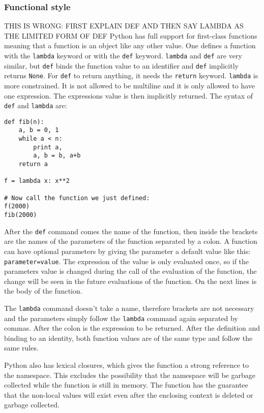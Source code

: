 \subsubsection{Functional style}

THIS IS WRONG: FIRST EXPLAIN DEF AND THEN SAY LAMBDA AS THE LIMITED FORM OF DEF
Python has full support for first-class functions meaning that a function is an
object like any other value. One defines a function with the \texttt{lambda}
keyword or with the \texttt{def} keyword. \texttt{lambda} and \texttt{def} are
very similar, but \texttt{def} binds the function value to an identifier and
\texttt{def} implicitly returns \texttt{None}. For \texttt{def} to return
anything, it needs the \texttt{return} keyword. \texttt{lambda} is more
constrained. It is not allowed to be multiline and it is only allowed to have
one expression. The expressions value is then implicitly returned. The syntax
of \verb;def; and \verb;lambda; are:
\begin{verbatim}
def fib(n):
    a, b = 0, 1
    while a < n:
        print a,
        a, b = b, a+b
    return a

f = lambda x: x**2

# Now call the function we just defined:
f(2000)
fib(2000)
\end{verbatim}
After the \verb;def; command comes the name of the function, then inside the
brackets are the names of the parameters of the function separated by a colon.
A function can have optional parameters by giving the parameter a default value
like this: \verb;parameter=value;. The expression of the value is only
evaluated once, so if the parameters value is changed during the call of the
evaluation of the function, the change will be seen in the future evaluations
of the function. On the next lines is the body of the function.

The \verb;lambda; command doesn't take a name, therefore brackets are not
necessary and the parameters simply follow the \verb;lambda; command again
separated by commas. After the colon is the expression to be returned. After
the definition and binding to an identity, both function values are of the same
type and follow the same rules.

Python also has lexical closures, which gives the function a strong reference to
the namespace. This excludes the possibility that the namespace will be garbage
collected while the function is still in memory. The function has the guarantee
that the non-local values will exist even after the enclosing context is deleted
or garbage collected.\cite{website:python-closures}

